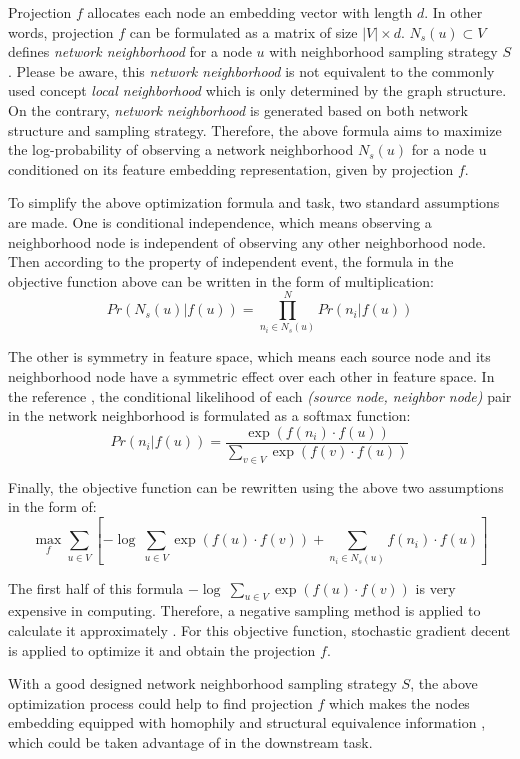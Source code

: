 \documentclass[sigconf]{acmart}
\begin{document}
Projection $f$ allocates each node an embedding vector with length $d$. In other words, projection $f$ can be formulated as a matrix of size $|V|\times d$. $N_s(u)\subset V$ defines \textit{network neighborhood} for a node $u$ with neighborhood sampling strategy $S$. Please be aware, this \textit{network neighborhood} is not equivalent to the commonly used concept \textit{local neighborhood} which is only determined by the graph structure. On the contrary, \textit{network neighborhood} is generated based on both network structure and sampling strategy. Therefore, the above formula aims to maximize the log-probability of observing a network neighborhood $N_s(u)$ for a node u conditioned on its feature embedding representation, given by projection $f$.

To simplify the above optimization formula and task, two standard assumptions are made. One is conditional independence, which means observing a neighborhood node is independent of observing any other neighborhood node. Then according to the property of independent event, the formula in the objective function above can be written in the form of multiplication:
$$Pr(N_s(u)|f(u))=\prod_{n_i\in N_s(u)}^N Pr(n_i|f(u))$$

The other is symmetry in feature space, which means each source node and its neighborhood node have a symmetric effect over each other in feature space. In the reference \cite{node2vec}, the conditional likelihood of each \textit{(source node, neighbor node)} pair in the network neighborhood is formulated as a softmax function:
$$Pr(n_i|f(u))=\frac{\exp(f(n_i)\cdot f(u))}{\sum_{v\in V} \exp(f(v)\cdot f(u))}$$

Finally, the objective function can be rewritten using the above two assumptions in the form of:
$$\mathop{max}\limits_{f} \sum_{u\in V}\left[-\log\ \sum_{u\in V}\exp(f(u)\cdot f(v))+ \sum_{n_i\in N_s(u)}f(n_i)\cdot f(u)\right]$$

The first half of this formula $-\log\ \sum_{u\in V}\exp(f(u)\cdot f(v))$ is very expensive in computing. Therefore, a negative sampling method is applied to calculate it approximately \cite{mikolov2013distributed}. For this objective function, stochastic gradient decent is applied to optimize it and obtain the projection $f$.

With a good designed network neighborhood sampling strategy $S$, the above optimization process could help to find projection $f$ which makes the nodes embedding equipped with homophily and structural equivalence information \cite{hoff2002latent}, which could be taken advantage of in the downstream task.
\end{document}
